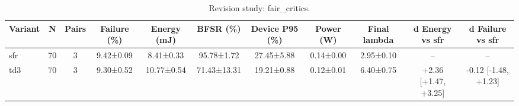 \begin{table}[t]
\centering
\caption{Revision study: fair_critics.}
\label{tab:rev_fair_critics}
\footnotesize
\setlength{\tabcolsep}{3pt}
\begin{tabular}{lcccccccccc}
\hline
Variant & N & Pairs & Failure (\%) & Energy (mJ) & BFSR (\%) & Device P95 (\%) & Power (W) & Final lambda & d Energy vs sfr & d Failure vs sfr \\
\hline
sfr & 70 & 3 & 9.42±0.09 & 8.41±0.33 & 95.78±1.72 & 27.45±5.88 & 0.14±0.00 & 2.95±0.10 & -- & -- \\
td3 & 70 & 3 & 9.30±0.52 & 10.77±0.54 & 71.43±13.31 & 19.21±0.88 & 0.12±0.01 & 6.40±0.75 & +2.36 [+1.47, +3.25] & -0.12 [-1.48, +1.23] \\
\hline
\end{tabular}
\end{table}
